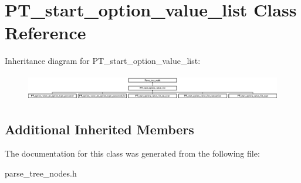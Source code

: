 \hypertarget{classPT__start__option__value__list}{}\section{P\+T\+\_\+start\+\_\+option\+\_\+value\+\_\+list Class Reference}
\label{classPT__start__option__value__list}
Inheritance diagram for P\+T\+\_\+start\+\_\+option\+\_\+value\+\_\+list\+:\begin{figure}[H]
\begin{center}
\leavevmode
\includegraphics[height=1.154639cm]{classPT__start__option__value__list}
\end{center}
\end{figure}
\subsection*{Additional Inherited Members}


The documentation for this class was generated from the following file\+:\begin{DoxyCompactItemize}
\item 
parse\+\_\+tree\+\_\+nodes.\+h\end{DoxyCompactItemize}
